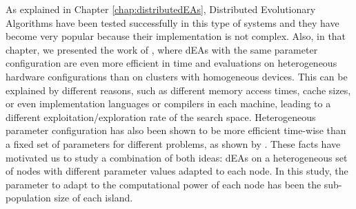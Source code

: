 As explained in Chapter \ref{chap:distributedEAs}, Distributed Evolutionary
Algorithms have been tested successfully in this
type of systems \cite{Alba2002Heterogeneous} and they have become very popular because their implementation is
not complex. %
 Also, in that chapter, %
 we presented the work of 
 \cite{Alba2002Heterogeneous}, where dEAs with the same parameter
 configuration are even %
more efficient in time and evaluations on heterogeneous hardware configurations than on clusters with
homogeneous devices. %
This can be explained by different reasons, such
as different memory access times, cache sizes, or even
implementation %
languages or compilers in each machine, leading to a different
exploitation/exploration rate of the search space.  %
Heterogeneous parameter configuration  has also been shown to be more  efficient time-wise than a fixed
set of parameters for different problems, as shown by  \cite{Gong2011HeterogeneousParameters}.   
These facts have motivated us to study a combination of both ideas: %
dEAs on a heterogeneous set of nodes with different parameter values
adapted to each node. %
In this study, the parameter to adapt to the
computational power of each node has been the sub-population size of
each island. %


